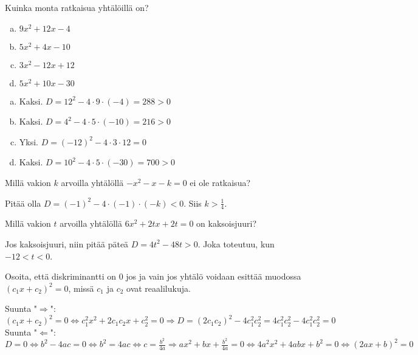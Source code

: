 \begin{tehtava}
	Kuinka monta ratkaisua yhtälöillä on?
	\begin{enumerate}[a)]
		\item $9x^2+12x-4$
		\item $5x^2+4x-10$
		\item $3x^2-12x+12$
		\item $5x^2+10x-30$
	\end{enumerate}
	\begin{vastaus}
		\begin{enumerate}[a)]
			\item Kaksi. $D=12^2-4 \cdot 9 \cdot (-4) = 288 >0$
			\item Kaksi. $D=4^2-4\cdot 5 \cdot (-10) = 216 >0$
			\item Yksi. $D=(-12)^2-4\cdot 3\cdot 12 =0$
			\item Kaksi. $D=10^2-4\cdot 5 \cdot (-30) = 700 >0$
		\end{enumerate}
	\end{vastaus}
\end{tehtava}

\begin{tehtava}
	Millä vakion $k$ arvoilla yhtälöllä $-x^2-x-k = 0$ ei ole ratkaisua?
	\begin{vastaus}
		Pitää olla $D=(-1)^2-4 \cdot (-1) \cdot (-k)<0$. Siis $k>\frac{1}{4}$.
	\end{vastaus}
\end{tehtava}

\begin{tehtava}
	Millä vakion $t$ arvoilla yhtälöllä $6x^2+2tx+2t=0$ on kaksoisjuuri?
	\begin{vastaus}
		Jos kaksoisjuuri, niin pitää päteä $D=4t^2-48t>0$. Joka toteutuu, kun $-12 < t < 0$.
	\end{vastaus}
\end{tehtava}

\begin{tehtava}
	Osoita, että diskriminantti on $0$ jos ja vain jos yhtälö voidaan esittää muodossa $(c_1 x+ c_2)^2=0$, missä $c_1$ ja $c_2$ ovat reaalilukuja.
	\begin{vastaus}
		Suunta "$\Rightarrow$": $(c_1 x+ c_2)^2=0 \Leftrightarrow c_1^2 x^2 + 2c_1 c_2 x+ c_2^2 =0 \Rightarrow
		D=(2 c_1 c_2)^2-4 c_1^2 c_2^2 =4 c_1^2 c_2^2 -4 c_1^2 c_2^2 =0$ \\
		Suunta "$\Leftarrow$": $D=0 \Leftrightarrow b^2-4ac=0 \Leftrightarrow b^2=4ac \Leftrightarrow c=\frac{b^2}{4a} \Rightarrow ax^2+bx+\frac{b^2}{4a}=0 \Leftrightarrow 4a^2x^2+4abx+b^2=0 \Leftrightarrow (2ax+b)^2=0$
	\end{vastaus}
\end{tehtava}

